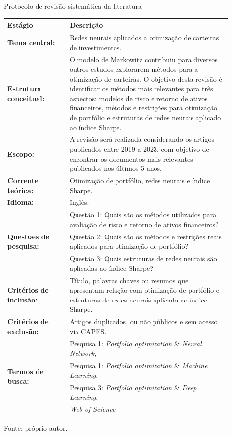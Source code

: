         \begin{quadro}[htbp]
            \centering
            \caption{Protocolo de revisão sistemática da literatura}
            \label{quadro:protocolo_revisao_sistematica}
            \begin{tabular}{p{0.25\linewidth}p{0.65\linewidth}}
                \hline
                \textbf{Estágio} & \textbf{Descrição} \\
                \hline \hline
                \textbf{Tema central:} & Redes neurais aplicados a otimização de carteiras de investimentos. \\ \hline
                \textbf{Estrutura conceitual:} & O modelo de Markowitz contribuiu para diversos outros estudos explorarem métodos para a otimização de carteiras. O objetivo desta revisão é identificar os métodos mais relevantes para três aspectos: modelos de risco e retorno de ativos financeiros, métodos e restrições para otimização de portfólio e estruturas de redes neurais aplicado ao índice Sharpe. \\ \hline
                \textbf{Escopo:} & A revisão será realizada considerando os artigos publicados entre 2019 a 2023, com objetivo de encontrar os documentos mais relevantes publicados nos últimos 5 anos. \\ \hline
                \textbf{Corrente teórica: } & Otimização de portfólio, redes neurais e índice Sharpe. \\ \hline
                \textbf{Idioma:} & Inglês. \\ \hline
                \multirow{3}{*}{\textbf{Questões de pesquisa:}} & Questão 1: Quais são os métodos utilizados para avaliação de risco e retorno de ativos financeiros? \\
                & Questão 2: Quais são os métodos e restrições reais aplicados para otimização de portfólio? \\
                & Questão 3: Quais estruturas de redes neurais são aplicadas ao índice Sharpe? \\ \hline
                \textbf{Critérios de inclusão:} & Título, palavras chaves ou resumos que apresentam relação com otimização de portfólio e estruturas de redes neurais aplicado ao índice Sharpe. \\ \hline
                \textbf{Critérios de exclusão:} & Artigos duplicados, ou não públicos e sem acesso via CAPES. \\ \hline
                \multirow{4}{*}{\textbf{\textbf{Termos de busca:}}} & Pesquisa 1: \textit{Portfolio optimization} \& \textit{Neural Network}, \\
                & Pesquisa 1: \textit{Portfolio optimization} \& \textit{Machine Learning}, \\
                & Pesquisa 3: \textit{Portfolio optimization} \& \textit{Deep Learning},\\
                \textbf{Fontes de pesquisa:} & \textit{Web of Science}. \\ \hline
            \end{tabular}
            \par \footnotesize Fonte: próprio autor. %
        \end{quadro}

